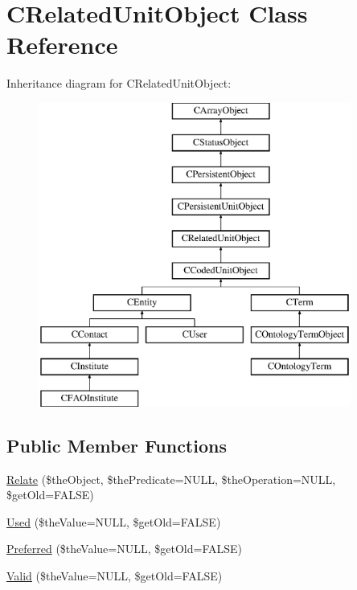 \hypertarget{class_c_related_unit_object}{\section{C\-Related\-Unit\-Object Class Reference}
\label{class_c_related_unit_object}
}
Inheritance diagram for C\-Related\-Unit\-Object\-:\begin{figure}[H]
\begin{center}
\leavevmode
\includegraphics[height=10.000000cm]{class_c_related_unit_object}
\end{center}
\end{figure}
\subsection*{Public Member Functions}
\begin{DoxyCompactItemize}
\item 
\hyperlink{class_c_related_unit_object_a46a7033129ae23ecda7f879f3fabdd5c}{Relate} (\$the\-Object, \$the\-Predicate=N\-U\-L\-L, \$the\-Operation=N\-U\-L\-L, \$get\-Old=F\-A\-L\-S\-E)
\item 
\hyperlink{class_c_related_unit_object_a6f19ef5d6eb0414712a16919e0ef3d5d}{Used} (\$the\-Value=N\-U\-L\-L, \$get\-Old=F\-A\-L\-S\-E)
\item 
\hyperlink{class_c_related_unit_object_a5f4a93894d26ead9fe1b80e39975ec12}{Preferred} (\$the\-Value=N\-U\-L\-L, \$get\-Old=F\-A\-L\-S\-E)
\item 
\hyperlink{class_c_related_unit_object_aea51a443754ab8c86a23ece7a2b18b1f}{Valid} (\$the\-Value=N\-U\-L\-L, \$get\-Old=F\-A\-L\-S\-E)
\end{DoxyCompactItemize}
